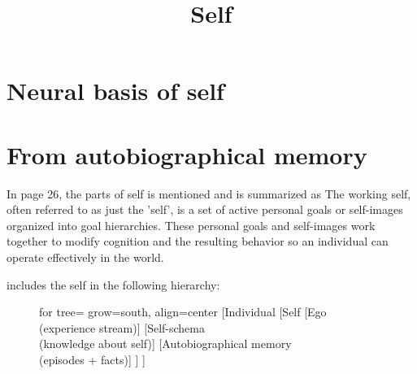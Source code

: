 \documentclass[a4paper]{article}
\title{Self}
\date{}
\begin{document}
	\maketitle
	
	\section{Neural basis of self}
	
	\section{From autobiographical memory}
		In \cite{brewer-1986-what-is-autobiographical-memory} page 26, the parts of self is mentioned and is summarized as
		The working self, often referred to as just the 'self', is a set of active personal goals or self-images organized into goal hierarchies. These personal goals and self-images work together to modify cognition and the resulting behavior so an individual can operate effectively in the world.
	
	\cite{brewer-1986-what-is-autobiographical-memory} includes the self in the following hierarchy:
	
	\begin{figure}[H]
		\centering
		\begin{forest}
			for tree={
				grow=south,
				align=center
			}
			[Individual
				[Self
					[Ego\\(experience stream)]
					[Self-schema\\(knowledge about self)]
					[Autobiographical memory\\(episodes + facts)]
				]
			]
		\end{forest}
	\end{figure}
	
\end{document}
